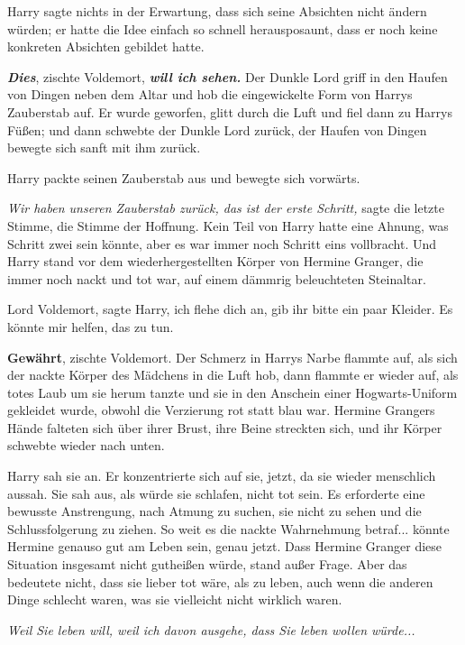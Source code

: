 Harry sagte nichts in der Erwartung, dass sich seine Absichten nicht ändern
würden; er hatte die Idee einfach so schnell herausposaunt, dass er noch keine
konkreten Absichten gebildet hatte.

\glqq{}\textbf{\emph{Dies}}\grqq{}, zischte Voldemort, \glqq{}\textbf{\emph{will
ich sehen.}}\grqq{} Der Dunkle Lord griff in den Haufen von Dingen neben dem Altar und
hob die eingewickelte Form von Harrys Zauberstab auf. Er wurde geworfen, glitt
durch die Luft und fiel dann zu Harrys Füßen; und dann schwebte der Dunkle Lord
zurück, der Haufen von Dingen bewegte sich sanft mit ihm zurück.

Harry packte seinen Zauberstab aus und bewegte sich vorwärts.

\emph{Wir haben unseren Zauberstab zurück, das ist der erste Schritt,} sagte die
letzte Stimme, die Stimme der Hoffnung. Kein Teil von Harry hatte eine Ahnung,
was Schritt zwei sein könnte, aber es war immer noch Schritt eins vollbracht.
Und Harry stand vor dem wiederhergestellten Körper von Hermine Granger, die
immer noch nackt und tot war, auf einem dämmrig beleuchteten Steinaltar.

\glqq{}Lord Voldemort\grqq{}, sagte Harry, \glqq{}ich flehe dich an, gib ihr bitte
ein paar Kleider. Es könnte mir helfen, das zu tun.\grqq{}

\glqq{}\textbf{Gewährt}\grqq{}, zischte Voldemort. Der Schmerz in Harrys Narbe
flammte auf, als sich der nackte Körper des Mädchens in die Luft hob, dann
flammte er wieder auf, als totes Laub um sie herum tanzte und sie in den
Anschein einer Hogwarts-Uniform gekleidet wurde, obwohl die Verzierung rot statt
blau war. Hermine Grangers Hände falteten sich über ihrer Brust, ihre Beine
streckten sich, und ihr Körper schwebte wieder nach unten.

Harry sah sie an. Er konzentrierte sich auf sie, jetzt, da sie wieder menschlich
aussah. Sie sah aus, als würde sie schlafen, nicht tot sein. Es erforderte eine
bewusste Anstrengung, nach Atmung zu suchen, sie nicht zu sehen und die
Schlussfolgerung zu ziehen. So weit es die nackte Wahrnehmung betraf... könnte
Hermine genauso gut am Leben sein, genau jetzt. Dass Hermine Granger diese
Situation insgesamt nicht gutheißen würde, stand außer Frage. Aber das bedeutete
nicht, dass sie lieber tot wäre, als zu leben, auch wenn die anderen Dinge
schlecht waren, was sie vielleicht nicht wirklich waren.

\emph{Weil Sie leben will, weil ich davon ausgehe, dass Sie leben wollen
würde...}


